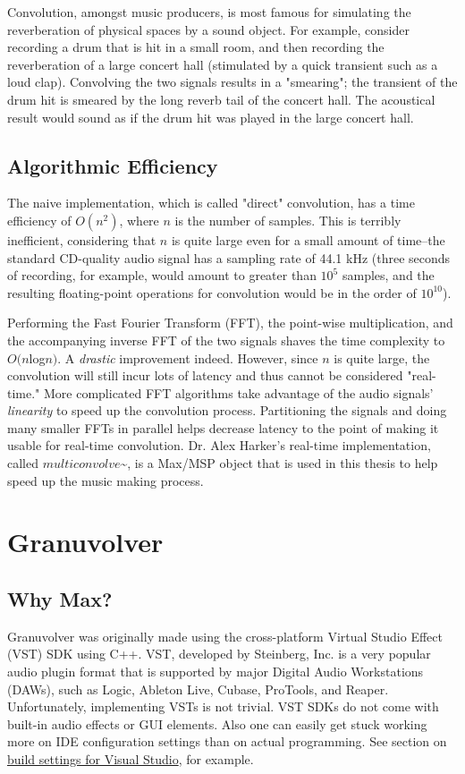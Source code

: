 \documentclass{article}
\begin{document}
			Convolution, amongst music producers, is most famous for simulating the reverberation of physical spaces by a sound object.  For example, consider recording a drum that is hit in a small room, and then recording the reverberation of a large concert hall (stimulated by a quick transient such as a loud clap).  Convolving the two signals results in a "smearing"; the transient of the drum hit is smeared by the long reverb tail of the concert hall. The acoustical result would sound as if the drum hit was played in the large concert hall.

		\subsection{Algorithmic Efficiency}

			The naive implementation, which is called "direct" convolution, has a time efficiency of $O(n^2)$, where $n$ is the number of samples. This is terribly inefficient, considering that $n$ is quite large even for a small amount of time--the standard CD-quality audio signal has a sampling rate of 44.1 kHz (three seconds of recording, for example, would amount to greater than $10^5$ samples, and the resulting floating-point operations for convolution would be in the order of $10^{10}$).  

			Performing the Fast Fourier Transform (FFT), the point-wise multiplication, and the accompanying inverse FFT of the two signals shaves the time complexity to $O(n$log$n)$. A \emph{drastic} improvement indeed.  However, since $n$ is quite large, the convolution will still incur lots of latency and thus cannot be considered "real-time."  More complicated FFT algorithms take advantage of the audio signals' \emph{linearity} to speed up the convolution process. Partitioning the signals and doing many smaller FFTs in parallel helps decrease latency to the point of making it usable for real-time convolution.\cite{Batten_conv} Dr. Alex Harker's real-time implementation, called $multiconvolve$\~{}, is a Max/MSP object that is used in this thesis to help speed up the music making process.\cite{pa}


	\section{Granuvolver}
		\subsection{Why Max?}
		Granuvolver was originally made using the cross-platform Virtual Studio Effect (VST) SDK using C++. VST, developed by Steinberg, Inc. is a very popular audio plugin format that is supported by major Digital Audio Workstations (DAWs), such as Logic, Ableton Live, Cubase, ProTools, and Reaper.  Unfortunately, implementing VSTs is not trivial. VST SDKs do not come with built-in audio effects or GUI elements. Also one can easily get stuck working more on IDE configuration settings than on actual programming. See section on  \href{http://teragonaudio.com/article/How-to-make-VST-plugins-in-Visual-Studio.html}{build settings for Visual Studio}, for example.
\end{document}

